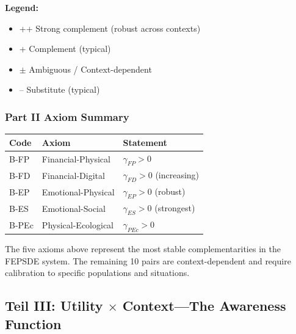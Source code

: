 \textbf{Legend:}
\begin{itemize}
    \item \colorbox{green!30}{++} Strong complement (robust across contexts)
    \item \colorbox{green!20}{+} Complement (typical)
    \item $\pm$ Ambiguous / Context-dependent
    \item \colorbox{red!20}{--} Substitute (typical)
\end{itemize}

\subsubsection{Part II Axiom Summary}

\begin{center}
\renewcommand{\arraystretch}{1.3}
\begin{tabular}{|l|l|l|}
\hline
\textbf{Code} & \textbf{Axiom} & \textbf{Statement} \\
\hline
B-FP & Financial-Physical & $\gamma_{FP} > 0$ \\
B-FD & Financial-Digital & $\gamma_{FD} > 0$ (increasing) \\
B-EP & Emotional-Physical & $\gamma_{EP} > 0$ (robust) \\
B-ES & Emotional-Social & $\gamma_{ES} > 0$ (strongest) \\
B-PEc & Physical-Ecological & $\gamma_{PEc} > 0$ \\
\hline
\end{tabular}
\end{center}

The five axioms above represent the most stable complementarities in the 
FEPSDE system. The remaining 10 pairs are context-dependent and require 
calibration to specific populations and situations.





\subsection{Teil III: Utility $\times$ Context---The Awareness Function}
\label{sec:utility-context}

